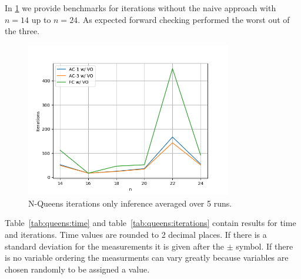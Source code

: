 In \cref{fig:queens:iterations-inference} we provide benchmarks for iterations without the naive approach with $n = 14$ up to $n = 24$. As expected forward checking performed the worst out of the three.

\begin{figure}[ht]
	\centering
	\includegraphics[width=0.8\textwidth]{./Problems/queens/plots/iterations_inference.png}
	\caption{N-Queens iterations only inference averaged over 5 runs.}
	\label{fig:queens:iterations-inference}
\end{figure}

Table~\ref{tab:queens:time} and table~\ref{tab:queens:iterations} contain results for time and iterations. Time values are rounded to 2 decimal places. If there is a standard deviation for the measurements it is given after the $\pm$ symbol. If there is no variable ordering the measurments can vary greatly because variables are chosen randomly to be assigned a value.

